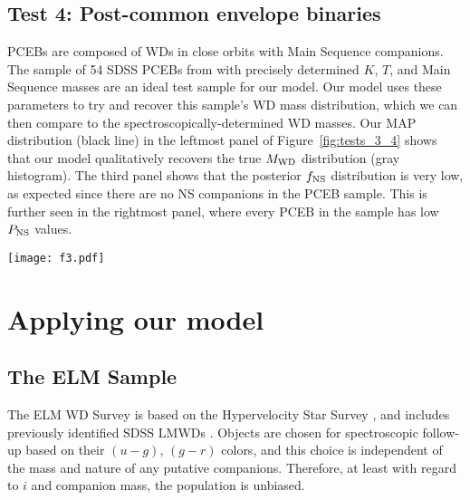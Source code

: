 \documentclass[apjl]{emulateapj}
\newcommand{\period}{T}
\begin{document}
\subsection{Test 4: Post-common envelope binaries} \label{sec:PCEB}
PCEBs are composed of WDs in close orbits with Main Sequence companions. The sample of 54 SDSS PCEBs from \citet{nebot11} with precisely determined $K$, $\period$, and Main Sequence masses are an ideal test sample for our model. Our model uses these parameters to try and recover this sample's WD mass distribution, which we can then compare to the spectroscopically-determined WD masses. 
Our MAP distribution (black line) in the leftmost panel of Figure~\ref{fig:tests_3_4} shows that our model qualitatively recovers the true $M_{\rm WD}$ distribution (gray histogram). The third panel shows that the posterior $f_{\rm NS}$ distribution is very low, as expected since there are no NS companions in the PCEB sample. This is further seen in the rightmost panel, where every PCEB in the sample has low $P_{\rm NS}$ values.

\begin{figure*}[h!]
\begin{center}
\texttt{[image: f3.pdf]}
\caption{ The results of our model when applied to Test 3 and 4 in Section~\ref{sec:tests}. The panels are in the same format as those in Figure~\ref{fig:tests_1_2}.}
\label{fig:tests_3_4}
\end{center}
\end{figure*}

\section{Applying our model}
\subsection{The ELM Sample}
The ELM WD Survey is based on the Hypervelocity Star Survey \citep{brown06}, and includes previously identified SDSS LMWDs \citep{eisenstein06,liebert04}. Objects are chosen for spectroscopic follow-up based on their $(u-g)$, $(g-r)$ colors, and this choice is independent of the mass and nature of any putative companions. Therefore, at least with regard to $i$ and companion mass, the population is unbiased.
\end{document}
